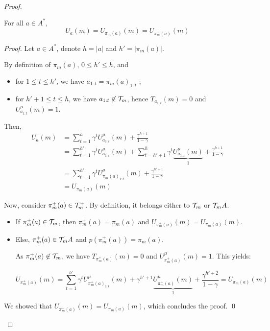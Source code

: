 \documentclass[runningheads]{llncs}
\begin{document}
\begin{proof}
\begin{lemma}
\label{lemma:value-conservation}
For all $a \in A^*$,
\begin{equation*}
    U_a(m) = U_{\pi_m(a)}(m) = U_{\pi_m^+(a)}(m)
\end{equation*}
\end{lemma}
\begin{proof}
Let $a \in A^*$, denote $h=|a|$ and $h'=|\pi_m(a)|$.

By definition of $\pi_m(a)$, $0 \leq h' \leq h$, and
\begin{itemize}
    \item for $1\leq t \leq h'$, we have $a_{1:t} = {\pi_m(a)}_{1:t}$ ;
    \item for $h'+1\leq t \leq h$, we have $a_{1:t} \not \in \mathcal{T}_m$, hence $T_{a_{1:t}}(m) = 0$ and $U^{\mu}_{a_{1:t}}(m) = 1$.
\end{itemize}
Then,
\begin{align*}
    U_a(m) &= \sum_{t=1}^h \gamma^t U^{\mu}_{a_{1:t}}(m) + \frac{\gamma^{h+1}}{1-\gamma} \\
    &= \sum_{t=1}^{h'} \gamma^t U^{\mu}_{a_{1:t}}(m) + \sum_{t=h'+1}^h \gamma^t \underbrace{U^{\mu}_{a_{1:t}}(m)}_1 + \frac{\gamma^{h+1}}{1-\gamma} \\
    &= \sum_{t=1}^{h'} \gamma^t U^{\mu}_{{\pi_m(a)}_{1:t}}(m) + \frac{\gamma^{h'+1}}{1-\gamma} \\
    &= U_{\pi_m(a)}(m)
\end{align*}

Now, consider $\pi_m^+(a) \in \mathcal{T}_m^+$.
By definition, it belongs either to $\mathcal{T}_m$ or $\mathcal{T}_m A$.
\begin{itemize}
    \item If $\pi_m^+(a) \in \mathcal{T}_m$, then $\pi_m^+(a) = \pi_m(a)$ and $U_{\pi_m^+(a)}(m) = U_{\pi_m(a)}(m)$.
    \item Else, $\pi_m^+(a) \in \mathcal{T}_m A$ and $p(\pi_m^+(a)) = \pi_m(a)$.
    
    As $\pi_m^+(a) \not \in \mathcal{T}_m$, we have $T_{\pi_m^+(a)}(m) = 0$ and $U^{\mu}_{\pi_m^+(a)}(m) = 1$.
    This yields:
    
    \begin{equation*}
        U_{\pi_m^+(a)}(m) = \sum_{t=1}^{h'} \gamma^t U^{\mu}_{{\pi_m^+(a)}_{1:t}}(m) + \gamma^{h'+1} \underbrace{U^{\mu}_{{\pi_m^+(a)}}(m)}_1 + \frac{\gamma^{h'+2}}{1-\gamma} = U_{\pi_m(a)}(m)
    \end{equation*}
    
\end{itemize}
We showed that $U_{\pi_m^+(a)}(m) = U_{\pi_m(a)}(m)$, which concludes the proof.
\qed
\end{proof}


\end{proof}
\end{document}
